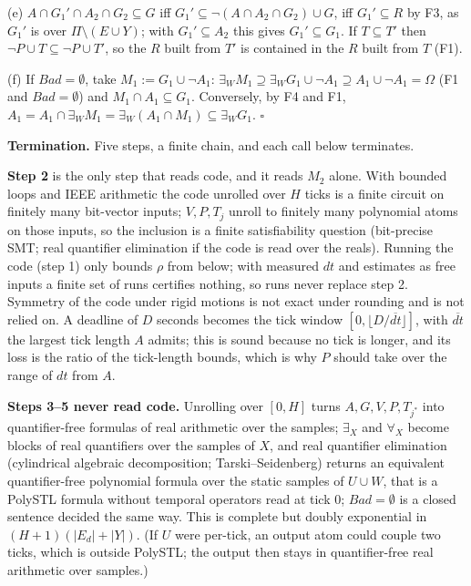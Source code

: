 \documentclass[10pt]{article}
\newcommand{\sect}[1]{\par\smallskip{\large\bfseries #1}\par\smallskip}
\newcommand{\ex}{\exists}
\newcommand{\fa}{\forall}
\begin{document}
(e) $A\cap G_1'\cap A_2\cap G_2\subseteq G$ iff $G_1'\subseteq\lnot(A\cap A_2\cap G_2)\cup G$, iff $G_1'\subseteq R$ by F3, as $G_1'$ is over $\Pi\setminus(E\cup Y)$; with $G_1'\subseteq A_2$ this gives $G_1'\subseteq G_1$. If $T\subseteq T'$ then $\lnot P\cup T\subseteq\lnot P\cup T'$, so the $R$ built from $T'$ is contained in the $R$ built from $T$ (F1).

(f) If $\mathit{Bad}=\emptyset$, take $M_1:=G_1\cup\lnot A_1$: $\ex_W M_1\supseteq\ex_W G_1\cup\lnot A_1\supseteq A_1\cup\lnot A_1=\Omega$ (F1 and $\mathit{Bad}=\emptyset$) and $M_1\cap A_1\subseteq G_1$. Conversely, by F4 and F1, $A_1=A_1\cap\ex_W M_1=\ex_W(A_1\cap M_1)\subseteq\ex_W G_1$. \hfill$\square$

\sect{5\quad Decidability and cost}

\textbf{Termination.} Five steps, a finite chain, and each call below terminates.

\textbf{Step 2} is the only step that reads code, and it reads $M_2$ alone. With bounded loops and IEEE arithmetic the code unrolled over $H$ ticks is a finite circuit on finitely many bit-vector inputs; $V,P,T_j$ unroll to finitely many polynomial atoms on those inputs, so the inclusion is a finite satisfiability question (bit-precise SMT; real quantifier elimination if the code is read over the reals). Running the code (step 1) only bounds $\rho$ from below; with measured $dt$ and estimates as free inputs a finite set of runs certifies nothing, so runs never replace step 2. Symmetry of the code under rigid motions is not exact under rounding and is not relied on. A deadline of $D$ seconds becomes the tick window $[0,\lfloor D/\overline{dt}\rfloor]$, with $\overline{dt}$ the largest tick length $A$ admits; this is sound because no tick is longer, and its loss is the ratio of the tick-length bounds, which is why $P$ should take over the range of $dt$ from $A$.

\textbf{Steps 3--5 never read code.} Unrolling over $[0,H]$ turns $A,G,V,P,T_{j^*}$ into quantifier-free formulas of real arithmetic over the samples; $\ex_X$ and $\fa_X$ become blocks of real quantifiers over the samples of $X$, and real quantifier elimination (cylindrical algebraic decomposition; Tarski--Seidenberg) returns an equivalent quantifier-free polynomial formula over the static samples of $U\cup W$, that is a PolySTL formula without temporal operators read at tick $0$; $\mathit{Bad}=\emptyset$ is a closed sentence decided the same way. This is complete but doubly exponential in $(H+1)(|E_d|+|Y|)$. (If $U$ were per-tick, an output atom could couple two ticks, which is outside PolySTL; the output then stays in quantifier-free real arithmetic over samples.)
\end{document}
